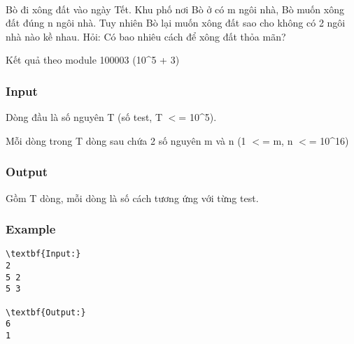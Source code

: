 

 

Bò đi xông đất vào ngày Tết. Khu phố nơi Bò ở có m ngôi nhà, Bò muốn xông đất đúng n ngôi nhà. Tuy nhiên Bò lại muốn xông đất sao cho không có 2 ngôi nhà nào kề nhau. Hỏi: Có bao nhiêu cách để xông đất thỏa mãn?

Kết quả theo module 100003 (10\textasciicircum5 + 3)

\subsubsection{Input}

Dòng đầu là số nguyên T (số test, T $<$= 10\textasciicircum5).

Mỗi dòng trong T dòng sau chứa 2 số nguyên m và n (1 $<$= m, n $<$= 10\textasciicircum16)

\subsubsection{Output}

Gồm T dòng, mỗi dòng là số cách tương ứng với từng test.

\subsubsection{Example}
\begin{verbatim}
\textbf{Input:}
2
5 2
5 3

\textbf{Output:}
6
1\end{verbatim}